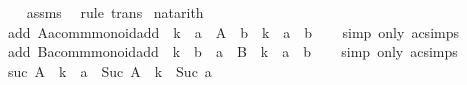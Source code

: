 \begin{isabellebody}
%
\isadelimproof
\ \ %
\endisadelimproof
%
\isatagproof
{}\isamarkupfalse%
\ assms{\isacharparenleft}{\kern0pt}{}{\isacharcomma}{\kern0pt}{}{\isacharparenright}{\kern0pt}\ \isamarkupfalse%
\ {\isacharparenleft}{\kern0pt}rule\ trans{\isacharparenright}{\kern0pt}%
\endisatagproof
{\isafoldproof}%
%
\isadelimproof
\isanewline
%
\endisadelimproof
\isanewline
{}\isamarkupfalse%
\ nat{\isacharunderscore}{\kern0pt}arith\isanewline
{}\isanewline
\isanewline
{}\isamarkupfalse%
\ add{}{\isacharcolon}{\kern0pt}\ {\isachardoublequoteopen}{\isacharparenleft}{\kern0pt}A{\isacharcolon}{\kern0pt}{\isacharcolon}{\kern0pt}{\isacharprime}{\kern0pt}a{\isacharcolon}{\kern0pt}{\isacharcolon}{\kern0pt}comm{\isacharunderscore}{\kern0pt}monoid{\isacharunderscore}{\kern0pt}add{\isacharparenright}{\kern0pt}\ {\isasymequiv}\ k\ {\isacharplus}{\kern0pt}\ a\ {\isasymLongrightarrow}\ A\ {\isacharplus}{\kern0pt}\ b\ {\isasymequiv}\ k\ {\isacharplus}{\kern0pt}\ {\isacharparenleft}{\kern0pt}a\ {\isacharplus}{\kern0pt}\ b{\isacharparenright}{\kern0pt}{\isachardoublequoteclose}\isanewline
%
\isadelimproof
\ \ %
\endisadelimproof
%
\isatagproof
{}\isamarkupfalse%
\ {\isacharparenleft}{\kern0pt}simp\ only{\isacharcolon}{\kern0pt}\ ac{\isacharunderscore}{\kern0pt}simps{\isacharparenright}{\kern0pt}%
\endisatagproof
{\isafoldproof}%
%
\isadelimproof
\isanewline
%
\endisadelimproof
\isanewline
{}\isamarkupfalse%
\ add{}{\isacharcolon}{\kern0pt}\ {\isachardoublequoteopen}{\isacharparenleft}{\kern0pt}B{\isacharcolon}{\kern0pt}{\isacharcolon}{\kern0pt}{\isacharprime}{\kern0pt}a{\isacharcolon}{\kern0pt}{\isacharcolon}{\kern0pt}comm{\isacharunderscore}{\kern0pt}monoid{\isacharunderscore}{\kern0pt}add{\isacharparenright}{\kern0pt}\ {\isasymequiv}\ k\ {\isacharplus}{\kern0pt}\ b\ {\isasymLongrightarrow}\ a\ {\isacharplus}{\kern0pt}\ B\ {\isasymequiv}\ k\ {\isacharplus}{\kern0pt}\ {\isacharparenleft}{\kern0pt}a\ {\isacharplus}{\kern0pt}\ b{\isacharparenright}{\kern0pt}{\isachardoublequoteclose}\isanewline
%
\isadelimproof
\ \ %
\endisadelimproof
%
\isatagproof
{}\isamarkupfalse%
\ {\isacharparenleft}{\kern0pt}simp\ only{\isacharcolon}{\kern0pt}\ ac{\isacharunderscore}{\kern0pt}simps{\isacharparenright}{\kern0pt}%
\endisatagproof
{\isafoldproof}%
%
\isadelimproof
\isanewline
%
\endisadelimproof
\isanewline
{}\isamarkupfalse%
\ suc{}{\isacharcolon}{\kern0pt}\ {\isachardoublequoteopen}A\ {\isacharequal}{\kern0pt}{\isacharequal}{\kern0pt}\ k\ {\isacharplus}{\kern0pt}\ a\ {\isasymLongrightarrow}\ Suc\ A\ {\isasymequiv}\ k\ {\isacharplus}{\kern0pt}\ Suc\ a{\isachardoublequoteclose}\isanewline

\end{isabellebody}
